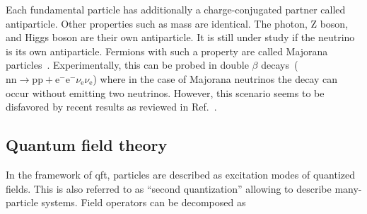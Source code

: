 
Each fundamental particle has additionally a charge-conjugated partner called antiparticle. Other properties such as mass are identical. The photon, Z boson, and Higgs boson are their own antiparticle. It is still under study if the neutrino is its own antiparticle. Fermions with such a property are called Majorana particles~\cite{Majorana2006}. Experimentally, this can be probed in double $\beta$ decays~($\mathrm{nn}\to\mathrm{pp}+\mathrm{e}^{-}\mathrm{e}^{-}\nu_\mathrm{e}\nu_\mathrm{e}$) where in the case of Majorana neutrinos the decay can occur without emitting two neutrinos. However, this scenario seems to be disfavored by recent results as reviewed in Ref.~\cite{Dell'Oro:2016dbc}.


\subsection{Quantum field theory}

In the framework of \gls{qft}, particles are described as excitation modes of quantized fields. This is also referred to as ``second quantization'' allowing to describe many-particle systems. Field operators can be decomposed as

